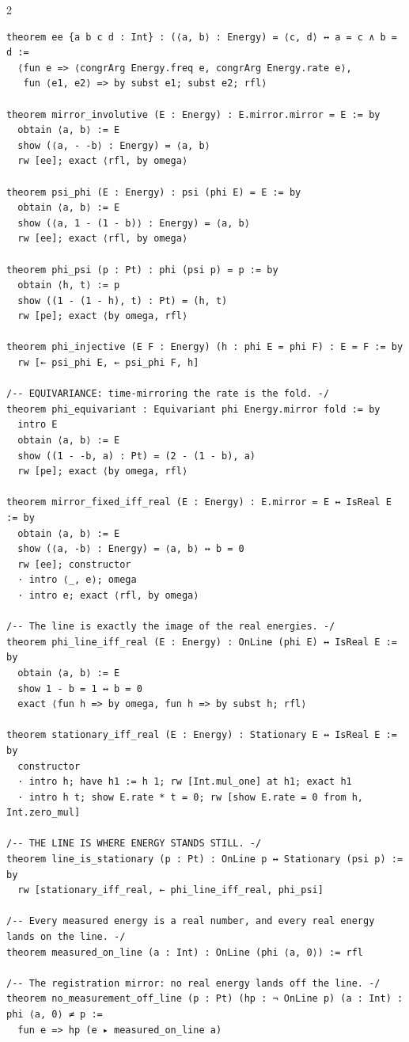 \documentclass[10pt]{article}
\begin{document}
\begin{multicols}{2}
\begin{Verbatim}[fontsize=\fontsize{5.9}{6.8}\selectfont,breaklines,breakanywhere,breaksymbolleft={}]
theorem ee {a b c d : Int} : (⟨a, b⟩ : Energy) = ⟨c, d⟩ ↔ a = c ∧ b = d :=
  ⟨fun e => ⟨congrArg Energy.freq e, congrArg Energy.rate e⟩,
   fun ⟨e1, e2⟩ => by subst e1; subst e2; rfl⟩

theorem mirror_involutive (E : Energy) : E.mirror.mirror = E := by
  obtain ⟨a, b⟩ := E
  show (⟨a, - -b⟩ : Energy) = ⟨a, b⟩
  rw [ee]; exact ⟨rfl, by omega⟩

theorem psi_phi (E : Energy) : psi (phi E) = E := by
  obtain ⟨a, b⟩ := E
  show (⟨a, 1 - (1 - b)⟩ : Energy) = ⟨a, b⟩
  rw [ee]; exact ⟨rfl, by omega⟩

theorem phi_psi (p : Pt) : phi (psi p) = p := by
  obtain ⟨h, t⟩ := p
  show ((1 - (1 - h), t) : Pt) = (h, t)
  rw [pe]; exact ⟨by omega, rfl⟩

theorem phi_injective (E F : Energy) (h : phi E = phi F) : E = F := by
  rw [← psi_phi E, ← psi_phi F, h]

/-- EQUIVARIANCE: time-mirroring the rate is the fold. -/
theorem phi_equivariant : Equivariant phi Energy.mirror fold := by
  intro E
  obtain ⟨a, b⟩ := E
  show ((1 - -b, a) : Pt) = (2 - (1 - b), a)
  rw [pe]; exact ⟨by omega, rfl⟩

theorem mirror_fixed_iff_real (E : Energy) : E.mirror = E ↔ IsReal E := by
  obtain ⟨a, b⟩ := E
  show (⟨a, -b⟩ : Energy) = ⟨a, b⟩ ↔ b = 0
  rw [ee]; constructor
  · intro ⟨_, e⟩; omega
  · intro e; exact ⟨rfl, by omega⟩

/-- The line is exactly the image of the real energies. -/
theorem phi_line_iff_real (E : Energy) : OnLine (phi E) ↔ IsReal E := by
  obtain ⟨a, b⟩ := E
  show 1 - b = 1 ↔ b = 0
  exact ⟨fun h => by omega, fun h => by subst h; rfl⟩

theorem stationary_iff_real (E : Energy) : Stationary E ↔ IsReal E := by
  constructor
  · intro h; have h1 := h 1; rw [Int.mul_one] at h1; exact h1
  · intro h t; show E.rate * t = 0; rw [show E.rate = 0 from h, Int.zero_mul]

/-- THE LINE IS WHERE ENERGY STANDS STILL. -/
theorem line_is_stationary (p : Pt) : OnLine p ↔ Stationary (psi p) := by
  rw [stationary_iff_real, ← phi_line_iff_real, phi_psi]

/-- Every measured energy is a real number, and every real energy lands on the line. -/
theorem measured_on_line (a : Int) : OnLine (phi ⟨a, 0⟩) := rfl

/-- The registration mirror: no real energy lands off the line. -/
theorem no_measurement_off_line (p : Pt) (hp : ¬ OnLine p) (a : Int) : phi ⟨a, 0⟩ ≠ p :=
  fun e => hp (e ▸ measured_on_line a)


\end{Verbatim}
\end{multicols}
\end{document}
